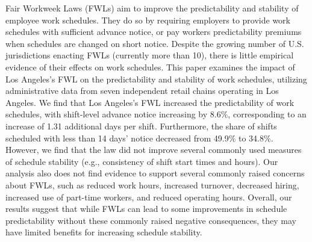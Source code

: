 \documentclass[letterpaper,11pt,leqno]{article}
\theoremstyle{paper}
\begin{document}
\begin{titlepage}\maketitle


\noindent
\begin{singlespace}
Fair Workweek Laws (FWLs) aim to improve the predictability and stability of employee work schedules. They do so by requiring employers to provide work schedules with sufficient advance notice, or pay workers predictability premiums when schedules are changed on short notice. Despite the growing number of U.S. jurisdictions enacting FWLs (currently more than 10), there is little empirical evidence of their effects on work schedules. This paper examines the impact of Los Angeles's FWL on the predictability and stability of work schedules, utilizing administrative data from seven independent retail chains operating in Los Angeles. We find that Los Angeles's FWL increased the predictability of work schedules, with shift-level advance notice increasing by 8.6\%, corresponding to an increase of 1.31 additional days per shift. Furthermore, the share of shifts scheduled with less than 14 days' notice decreased from 49.9\% to 34.8\%. However, we find that the law did not improve several commonly used measures of schedule stability (e.g., consistency of shift start times and hours). Our analysis also does not find evidence to support several commonly raised concerns about FWLs, such as reduced work hours, increased turnover, decreased hiring, increased use of part-time workers, and reduced operating hours. Overall, our results suggest that while FWLs can lead to some improvements in schedule predictability without these commonly raised negative consequences, they may have limited benefits for increasing schedule stability.



    
\end{singlespace}




\end{titlepage}
\end{document}
